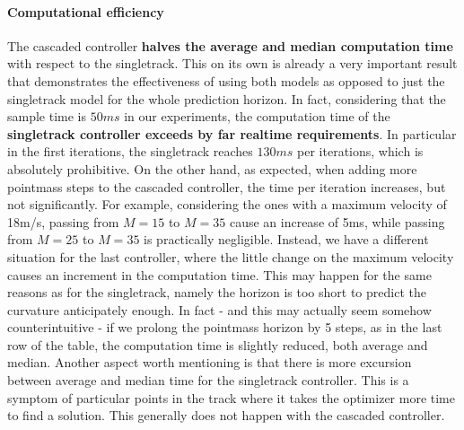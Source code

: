 \documentclass[a4paper, onecolumn, 12pt]{article}
\begin{document}
\paragraph{Computational efficiency}
The cascaded controller \textbf{halves the average and median computation time}
with respect to the singletrack. This on its own is already a very important
result that demonstrates the effectiveness of using both models as opposed to
just the singletrack model for the whole prediction horizon. In fact,
considering that the sample time is $50ms$ in our experiments, the computation
time of the \textbf{singletrack controller exceeds by far realtime
requirements}. In particular in the first iterations, the singletrack reaches
$130ms$ per iterations, which is absolutely prohibitive. On the other hand, as
expected, when adding more pointmass steps to the cascaded controller, the time
per iteration increases, but not significantly. For example, considering the
ones with a maximum velocity of 18m/s, passing from $M=15$ to $M=35$ cause an
increase of 5ms, while passing from $M=25$ to $M=35$ is practically negligible.
Instead, we have a different situation for the last controller, where the little
change on the maximum velocity causes an increment in the computation time. This
may happen for the same reasons as for the singletrack, namely the horizon is
too short to predict the curvature anticipately enough. In fact - and this may
actually seem somehow counterintuitive - if we prolong the pointmass horizon by 5
steps, as in the last row of the table, the computation time is slightly
reduced, both average and median. Another aspect worth mentioning is that there
is more excursion between average and median time for the singletrack
controller. This is a symptom of particular points in the track where it takes
the optimizer more time to find a solution. This generally does not happen with
the cascaded controller.
\end{document}
